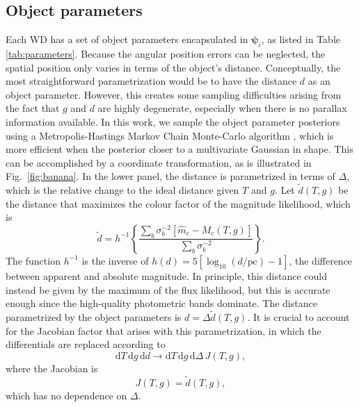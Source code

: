 \documentclass[fleqn,usenatbib]{mnras}
\newcommand{\objp}{\boldsymbol{\psi}}
\newcommand{\Teff}{T}
\newcommand{\logg}{g}
\newcommand{\de}{\text{d}}
\begin{document}
\subsection{Object parameters}\label{sec:objectparams}

Each WD has a set of object parameters encapsulated in $\objp_i$, as listed in Table \ref{tab:parameters}. Because the angular position errors can be neglected, the spatial position only varies in terms of the object's distance. Conceptually, the most straightforward parametrization would be to have the distance $d$ as an object parameter. However, this creates some sampling difficulties arising from the fact that $\logg$ and $d$ are highly degenerate, especially when there is no parallax information available. In this work, we sample the object parameter posteriors using a Metropolis-Hastings Markov Chain Monte-Carlo algorithm \citep{1953JChPh..21.1087M,brooks2011handbook}, which is more efficient when the posterior closer to a multivariate Gaussian in shape. This can be accomplished by a coordinate transformation, as is illustrated in Fig.~\ref{fig:banana}. In the lower panel, the distance is parametrized in terms of $\Delta$, which is the relative change to the ideal distance given $\Teff$ and $\logg$. Let $\tilde{d}(\Teff,\logg)$ be the distance that maximizes the colour factor of the magnitude likelihood, which is
\begin{equation}
	\tilde{d} = 
    h^{-1}\left\{ \frac{\sum_b \sigma_b^{-2} [\hat{m}_c-M_c(\Teff,\logg)]}{\sum_b \sigma_b^{-2}} \right\}.
\end{equation}
The function $h^{-1}$ is the inverse of $h(d)=5[\log_{10}(d/\text{pc})-1]$, the difference between apparent and absolute magnitude. In principle, this distance could instead be given by the maximum of the flux likelihood, but this is accurate enough since the high-quality photometric bands dominate. The distance parametrized by the object parameters is $d=\Delta\tilde{d}(\Teff,\logg)$. It is crucial to account for the Jacobian factor that arises with this parametrization, in which the differentials are replaced according to
\begin{equation}
	\de \Teff\, \de \logg\, \de d \rightarrow \de \Teff\, \de \logg\, \de \Delta\, J(\Teff,\logg),
\end{equation}
where the Jacobian is
\begin{equation}
	J(\Teff,\logg) = \tilde{d}(\Teff,\logg),
\end{equation}
which has no dependence on $\Delta$.
\end{document}
